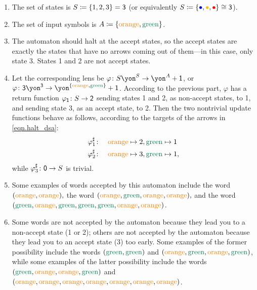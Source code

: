 \documentclass[Book-Poly]{subfiles}
\begin{document}
\begin{exercise}
\begin{solution}
\begin{enumerate}
    \item The set of states is $S\coloneqq\{1,2,3\}=\textsf{3}$ (or equivalently $S\coloneqq\{\bul[blue],\bul[dyellow],\bul[red]\}\iso\3$).
    \item The set of input symbols is $A\coloneqq\{{\color{orange}\text{orange}},{\color{dgreen}\text{green}}\}$.
    \item The automaton should halt at the accept states, so the accept states are exactly the states that have no arrows coming out of them---in this case, only state 3.
    States 1 and 2 are not accept states.
    \item Let the corresponding lens be $\varphi\colon S\yon^S\to\yon^A+\1$, or $\varphi\colon \3\yon^\3\to\yon^{\{{\color{orange}\text{orange}},{\color{dgreen}\text{green}}\}}+\1$.
    According to the previous part, $\varphi$ has a return function $\varphi_{\textsf{1}}\colon S\to\textsf{2}$ sending states 1 and 2, as non-accept states, to 1, and sending state 3, as an accept state, to 2.
    Then the two nontrivial update functions behave as follows, according to the targets of the arrows in \eqref{eqn.halt_dsa}:
    \begin{align*}
        \varphi^\sharp_1&\colon\quad{\color{orange}\text{orange}}\mapsto2,{\color{dgreen}\text{green}}\mapsto1\\
        \varphi^\sharp_2&\colon\quad{\color{orange}\text{orange}}\mapsto3,{\color{dgreen}\text{green}}\mapsto1,
    \end{align*}
    while $\varphi^\sharp_3\colon\textsf{0}\to S$ is trivial.
    \item Some examples of words accepted by this automaton include the word $({\color{orange}\text{orange}},{\color{orange}\text{orange}}),$ the word $({\color{orange}\text{orange}},{\color{dgreen}\text{green}},{\color{orange}\text{orange}},{\color{orange}\text{orange}}),$ and the word $({\color{dgreen}\text{green}},{\color{orange}\text{orange}},{\color{dgreen}\text{green}},{\color{dgreen}\text{green}},{\color{dgreen}\text{green}},{\color{orange}\text{orange}},{\color{orange}\text{orange}})$.
    \item Some words are not accepted by the automaton because they lead you to a non-accept state (1 or 2); others are not accepted by the automaton because they lead you to an accept state (3) too early.
    Some examples of the former possibility include the words $({\color{dgreen}\text{green}},{\color{dgreen}\text{green}})$ and $({\color{orange}\text{orange}},{\color{dgreen}\text{green}},{\color{orange}\text{orange}},{\color{dgreen}\text{green}})$, while some examples of the latter possibility include the words $({\color{dgreen}\text{green}},{\color{orange}\text{orange}},{\color{orange}\text{orange}},{\color{dgreen}\text{green}})$ and $({\color{orange}\text{orange}},{\color{orange}\text{orange}},{\color{orange}\text{orange}},{\color{orange}\text{orange}},{\color{orange}\text{orange}},{\color{orange}\text{orange}},{\color{orange}\text{orange}})$.
\end{enumerate}
\end{solution}
\end{exercise}
\end{document}
